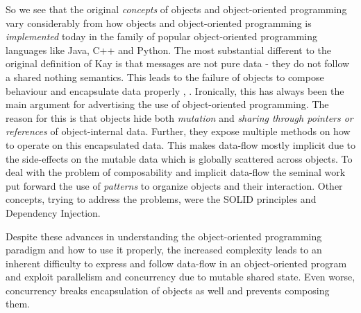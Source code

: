 

So we see that the original \textit{concepts} of objects and object-oriented programming vary considerably from how objects and object-oriented programming is \textit{implemented} today in the family of popular object-oriented programming languages like Java, C++ and Python. The most substantial different to the original definition of Kay is that messages are not pure data - they do not follow a shared nothing semantics. This leads to the failure of objects to compose behaviour and encapsulate data properly \cite{bill_what_2017}, \cite{erkki_lindpere_why_2013}. Ironically, this has always been the main argument for advertising the use of object-oriented programming. The reason for this is that objects hide both \textit{mutation} and \textit{sharing through pointers or references} of object-internal data. Further, they expose multiple methods on how to operate on this encapsulated data. This makes data-flow mostly implicit due to the side-effects on the mutable data which is globally scattered across objects. To deal with the problem of composability and implicit data-flow the seminal work \cite{gamma_design_1994} put forward the use of \textit{patterns} to organize objects and their interaction. Other concepts, trying to address the problems, were the SOLID principles and Dependency Injection. 

Despite these advances in understanding the object-oriented programming paradigm and how to use it properly, the increased complexity leads to an inherent difficulty to express and follow data-flow in an object-oriented program and exploit parallelism and concurrency due to mutable shared state. Even worse, concurrency breaks encapsulation of objects as well and prevents composing them. 

